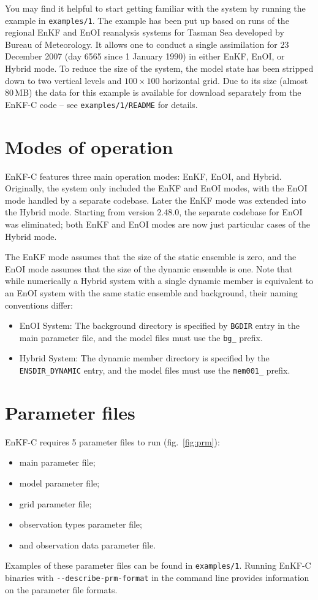 \documentclass[11pt]{report}
\begin{document}
You may find it helpful to start getting familiar with the system by running the example in \verb|examples/1|.
The example has been put up based on runs of the regional EnKF and EnOI reanalysis systems for Tasman Sea developed by Bureau of Meteorology. 
It allows one to conduct a single assimilation for 23 December 2007 (day 6565 since 1 January 1990) in either EnKF, EnOI, or Hybrid mode.
To reduce the size of the system, the model state has been stripped down to two vertical levels and $100 \times 100$ horizontal grid.
Due to its size (almost 80\,MB) the data for this example is available for download separately from the EnKF-C code -- see \verb|examples/1/README| for details.

\section{Modes of operation}

EnKF-C features three main operation modes: EnKF, EnOI, and Hybrid.
Originally, the system only included the EnKF and EnOI modes, with the EnOI mode handled by a separate codebase.
Later the EnKF mode was extended into the Hybrid mode.
Starting from version 2.48.0, the separate codebase for EnOI was eliminated; both EnKF and EnOI modes are now just particular cases of the Hybrid mode.

The EnKF mode assumes that the size of the static ensemble is zero, and the EnOI mode assumes that the size of the dynamic ensemble is one.
Note that while numerically a Hybrid system with a single dynamic member is equivalent to an EnOI system with the same static ensemble and background, their naming conventions differ:
\begin{itemize}
\item{EnOI System: The background directory is specified by \verb|BGDIR| entry in the main parameter file, and the model files must use the \verb|bg_| prefix.}
\item{Hybrid System: The dynamic member directory is specified by the \verb|ENSDIR_DYNAMIC| entry, and the model files must use the \verb|mem001_| prefix.}
\end{itemize}

\section{Parameter files}

EnKF-C requires 5 parameter files to run (fig.~\ref{fig:prm}):
\begin{itemize} 
\item main parameter file;
\item model parameter file;
\item grid parameter file;
\item observation types parameter file;
\item and observation data parameter file.
\end{itemize}
Examples of these parameter files can be found in \verb|examples/1|.
Running EnKF-C binaries with \verb|--describe-prm-format| in the command line provides information on the parameter file formats.
\end{document}
